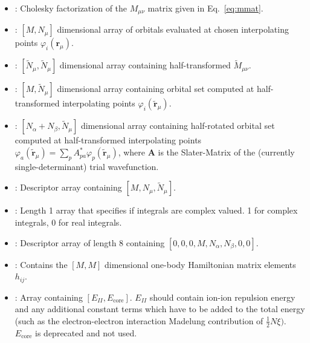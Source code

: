 \begin{itemize}
    \item {}: Cholesky factorization of the $M_{\mu\nu}$ matrix given in Eq.~\ref{eq:mmat}.
    \item {}: $[M,N_\mu]$ dimensional array of orbitals evaluated at chosen interpolating points $\varphi_i(\mathbf{r}_\mu)$.
    \item {}: $[\tilde{N}_\mu,\tilde{N}_\mu]$ dimensional array containing half-transformed $\tilde{M}_{\mu\nu}$.
    \item {}: $[M,\tilde{N}_\mu]$ dimensional array containing orbital set computed at half-transformed interpolating points $\varphi_i(\tilde{\mathbf{r}}_\mu)$.
    \item {}: $[N_\alpha+N_\beta,\tilde{N}_\mu]$ dimensional array containing half-rotated orbital set computed at half-transformed interpolating points $\varphi_a(\tilde{\mathbf{r}}_\mu) = \sum_{p} A_{pa}^* \varphi_{p}(\tilde{\mathbf{r}}_\mu)$, where $\mathbf{A}$ is the Slater-Matrix of the (currently single-determinant) trial wavefunction.
    \item {}: Descriptor array containing $[M, N_\mu, \tilde{N}_\mu]$.
    \item {}: Length 1 array that specifies if integrals are complex valued. 1 for complex integrals, 0 for real integrals.
    \item {}: Descriptor array of length 8 containing $[0,0,0,M,N_\alpha,N_\beta,0,0]$.
    \item {}: Contains the $[M,M]$ dimensional one-body Hamiltonian matrix elements $h_{ij}$.
    \item {}: Array containing $[E_{II}, E_{\mathrm{core}}]$. $E_{II}$ should contain ion-ion repulsion energy and any additional constant terms which have to be added to the total energy (such as the electron-electron interaction Madelung contribution of $\frac{1}{2} N \xi )$. $E_{\mathrm{core}}$ is deprecated and not used.
\end{itemize}


